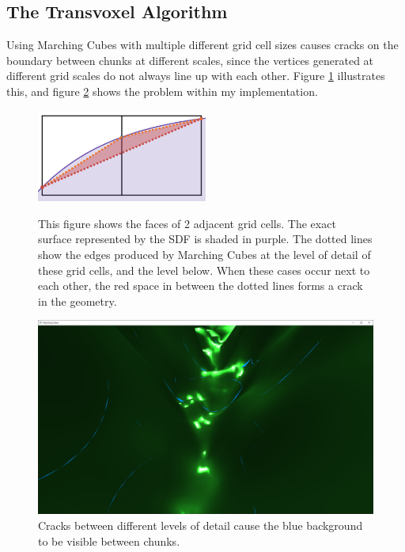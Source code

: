 \documentclass[11pt]{article}
\begin{document}
\subsection{The Transvoxel Algorithm}
\label{section:cracks}
Using Marching Cubes with multiple different grid cell sizes causes cracks on the boundary between chunks at different scales, since the vertices generated at different grid scales do not always line up with each other. Figure \ref{fig:cracks_demo} illustrates this, and figure \ref{fig:cracks2} shows the problem within my implementation.

\begin{figure}
  \caption{This figure shows the faces of 2 adjacent grid cells. The exact surface represented by the SDF is shaded in purple. The dotted lines show the edges produced by Marching Cubes at the level of detail of these grid cells, and the level below. When these cases occur next to each other, the red space in between the dotted lines forms a crack in the geometry.}
  \includegraphics[width=0.5\textwidth]{cracks_demo.png}
  \label{fig:cracks_demo}
\end{figure}

\begin{figure}[H]
  \includegraphics[width=\textwidth]{cracks2.png}
  \caption{Cracks between different levels of detail cause the blue background to be visible between chunks.}
  \label{fig:cracks2}
\end{figure}
\end{document}
